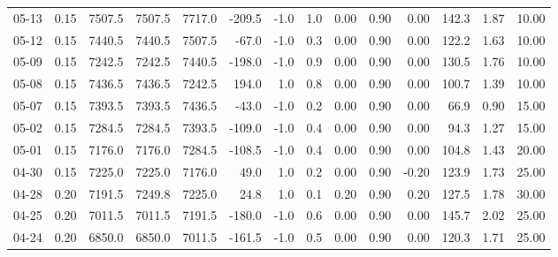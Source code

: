 \begin{threeparttable}
{\begin{tabular}{lrrrrrrrrrrrrr}
  05-13 &     0.15 & 7507.5 & 7507.5 & 7717.0 &     -209.5 &                     -1.0 &                 1.0 &       0.00 &      0.90 &           0.00 &            142.3 &            1.87 &                  10.00 \\
  05-12 &     0.15 & 7440.5 & 7440.5 & 7507.5 &      -67.0 &                     -1.0 &                 0.3 &       0.00 &      0.90 &           0.00 &            122.2 &            1.63 &                  10.00 \\
  05-09 &     0.15 & 7242.5 & 7242.5 & 7440.5 &     -198.0 &                     -1.0 &                 0.9 &       0.00 &      0.90 &           0.00 &            130.5 &            1.76 &                  10.00 \\
  05-08 &     0.15 & 7436.5 & 7436.5 & 7242.5 &      194.0 &                      1.0 &                 0.8 &       0.00 &      0.90 &           0.00 &            100.7 &            1.39 &                  10.00 \\
  05-07 &     0.15 & 7393.5 & 7393.5 & 7436.5 &      -43.0 &                     -1.0 &                 0.2 &       0.00 &      0.90 &           0.00 &             66.9 &            0.90 &                  15.00 \\
  05-02 &     0.15 & 7284.5 & 7284.5 & 7393.5 &     -109.0 &                     -1.0 &                 0.4 &       0.00 &      0.90 &           0.00 &             94.3 &            1.27 &                  15.00 \\
  05-01 &     0.15 & 7176.0 & 7176.0 & 7284.5 &     -108.5 &                     -1.0 &                 0.4 &       0.00 &      0.90 &           0.00 &            104.8 &            1.43 &                  20.00 \\
  04-30 &     0.15 & 7225.0 & 7225.0 & 7176.0 &       49.0 &                      1.0 &                 0.2 &       0.00 &      0.90 &          -0.20 &            123.9 &            1.73 &                  25.00 \\
  04-28 &     0.20 & 7191.5 & 7249.8 & 7225.0 &       24.8 &                      1.0 &                 0.1 &       0.20 &      0.90 &           0.20 &            127.5 &            1.78 &                  30.00 \\
  04-25 &     0.20 & 7011.5 & 7011.5 & 7191.5 &     -180.0 &                     -1.0 &                 0.6 &       0.00 &      0.90 &           0.00 &            145.7 &            2.02 &                  25.00 \\
  04-24 &     0.20 & 6850.0 & 6850.0 & 7011.5 &     -161.5 &                     -1.0 &                 0.5 &       0.00 &      0.90 &           0.00 &            120.3 &            1.71 &                  25.00 \\

\end{tabular}}
\end{threeparttable}
